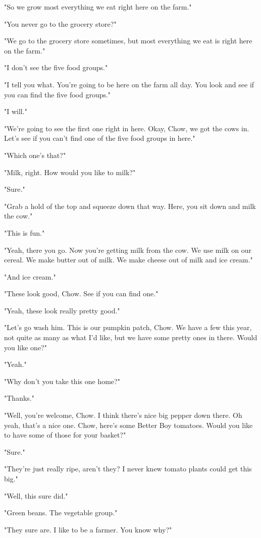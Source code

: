 "So we grow most everything we eat right here on the farm."

"You never go to the grocery store?"

"We go to the grocery store sometimes, but most everything we eat is right here on the farm."

"I don't see the five food groups."

"I tell you what. You're going to be here on the farm all day. You look and see if you can find the five food groups."

"I will."

"We're going to see the first one right in here. Okay, Chow, we got the cows in. Let's see if you can't find one of the five food groups in here."

"Which one's that?"

"Milk, right. How would you like to milk?"

"Sure."

"Grab a hold of the top and squeeze down that way. Here, you sit down and milk the cow."

"This is fun."

"Yeah, there you go. Now you're getting milk from the cow. We use milk on our cereal. We make butter out of milk. We make cheese out of milk and ice cream."

"And ice cream."

"These look good, Chow. See if you can find one."

"Yeah, these look really pretty good."

"Let's go wash him. This is our pumpkin patch, Chow. We have a few this year, not quite as many as what I'd like, but we have some pretty ones in there. Would you like one?"

"Yeah."

"Why don't you take this one home?"

"Thanks."

"Well, you're welcome, Chow. I think there's nice big pepper down there. Oh yeah, that's a nice one. Chow, here's some Better Boy tomatoes. Would you like to have some of those for your basket?"

"Sure."

"They're just really ripe, aren't they? I never knew tomato plants could get this big."

"Well, this sure did."

"Green beans. The vegetable group."

"They sure are. I like to be a farmer. You know why?"

